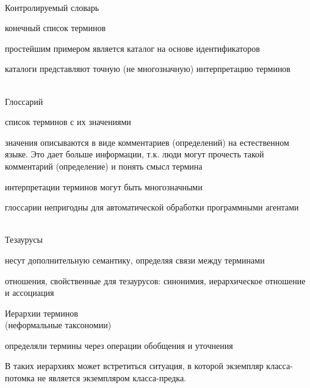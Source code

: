 \begin{frame}{\\Контролируемый словарь}
	\topline
	\justifying
	
	\vspace{10mm}
	\begin{textitemize}
		\item конечный список терминов
		\item простейшим примером является каталог на основе идентификаторов
		\item каталоги представляют точную (не многозначную) интерпретацию терминов
	\end{textitemize}
	
\end{frame}

\begin{frame}{\\Глоссарий}
	\topline
	\justifying
	
	\vspace{10mm}
	\begin{textitemize}
		\item список терминов с их значениями
		\item значения описываются в виде комментариев (определений) на естественном языке. Это дает больше информации, т.к. люди могут прочесть такой комментарий (определение) и понять смысл термина
		\item интерпретации терминов могут быть многозначными
		\item глоссарии непригодны для автоматической обработки программными агентами
	\end{textitemize}
	
\end{frame}

\begin{frame}{\\Тезаурусы}
	\topline
	\justifying
	
	\vspace{10mm}
	\begin{textitemize}
		\item несут дополнительную семантику, определяя связи между терминами
		\item отношения, свойственные для тезаурусов: синонимия, иерархическое отношение и ассоциация
	\end{textitemize}
	
\end{frame}

\begin{frame}{Иерархии терминов\\ (неформальные таксономии)}
	\topline
	\justifying
	
	\vspace{10mm}
	\begin{textitemize}
		\item определяли термины через операции обобщения и уточнения
		\item В таких иерархиях может встретиться ситуация, в которой экземпляр класса-потомка не является экземпляром класса-предка.
	\end{textitemize}
	
\end{frame}

